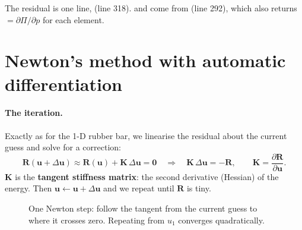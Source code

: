 \documentclass[11pt,a4paper]{article}
\numberwithin{equation}{section}
\newcommand{\code}[1]{\texttt{\detokenize{#1}}}
\newcommand{\x}{\mathbf{x}}
\newcommand{\uu}{\mathbf{u}}
\newcommand{\K}{\mathbf{K}}
\newcommand{\R}{\mathbf{R}}
\begin{document}
\begin{incode}
The residual is one line, \code{R = (f - P * gV)} (line 318). \code{f} and \code{gV} come
from \code{FEModel.forces} (line 292), which also returns \code{rp}
$=\partial\Pi/\partial p$ for each element.
\end{incode}

\section{Newton's method with automatic differentiation}
\label{sec:newton}

\paragraph{The iteration.}
Exactly as for the 1-D rubber bar, we linearise the residual about the current guess
and solve for a correction:
\begin{equation}
\R(\uu+\Delta\uu)\approx\R(\uu)+\K\,\Delta\uu=\mathbf{0}
\quad\Longrightarrow\quad \K\,\Delta\uu=-\R,\qquad \K=\frac{\partial\R}{\partial\uu}.
\end{equation}
$\K$ is the \textbf{tangent stiffness matrix}: the second derivative (Hessian) of
the energy. Then $\uu\leftarrow\uu+\Delta\uu$ and we repeat until $\R$ is tiny.

\begin{figure}[H]
\centering
{}
\caption{One Newton step: follow the tangent from the current guess to where it
crosses zero. Repeating from $u_1$ converges quadratically.}
\end{figure}
\end{document}
